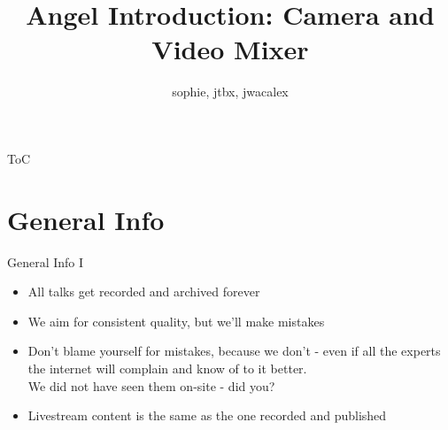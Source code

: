 \documentclass[aspectratio=169]{beamer}
\title{Angel Introduction: Camera and Video Mixer}
\author{sophie, jtbx, jwacalex}
\institute{C3VOC@EH20}
\begin{document}

\maketitle

\begin{frame}{ToC}
\tableofcontents
\end{frame}


\newpage





\section{General Info}
\begin{frame}{General Info I}
	\begin{itemize}
		\item All talks get recorded and archived forever
		\item We aim for consistent quality, but we'll make mistakes
		\item Don't blame yourself for mistakes, because we don't - even if all the experts the internet will complain and know of to it better. \\ We did not have seen them on-site - did you?
		\item Livestream content is the same as the one recorded and published
	\end{itemize}
\end{frame}
\end{document}
